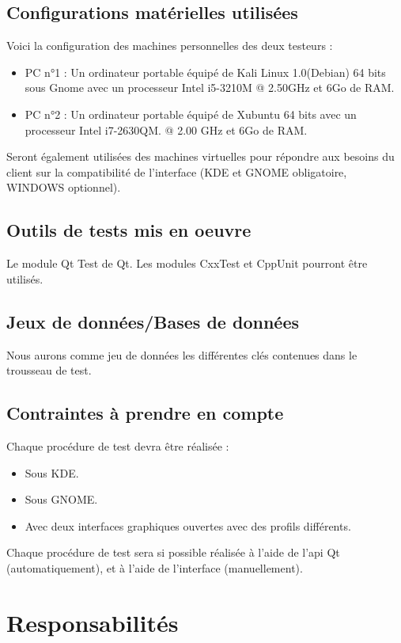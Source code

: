 \documentclass{../res/univ-projet}
\begin{document}
\subsection{Configurations matérielles utilisées}
Voici la configuration des machines personnelles des deux testeurs :
\begin{itemize}
 \item PC n°1 : Un ordinateur portable équipé de Kali Linux 1.0(Debian) 64 bits sous Gnome avec un processeur Intel i5-3210M @ 2.50GHz et 6Go de RAM.
 \item PC n°2 : Un ordinateur portable équipé de Xubuntu 64 bits avec un processeur Intel i7-2630QM.
 @ 2.00 GHz et 6Go de RAM.
\end{itemize}
Seront également utilisées des machines virtuelles pour répondre aux besoins du client sur la compatibilité de l'interface (KDE et GNOME obligatoire,
WINDOWS optionnel).

\subsection{Outils de tests mis en oeuvre}
Le module Qt Test de Qt.
Les modules CxxTest et CppUnit pourront être utilisés.

\subsection{Jeux de données/Bases de données}
Nous aurons comme jeu de données les différentes clés contenues dans le trousseau de test.


\subsection{Contraintes à prendre en compte}
Chaque procédure de test devra être réalisée :
\begin{itemize}
 \item Sous KDE.
 \item Sous GNOME.
 \item Avec deux interfaces graphiques ouvertes avec des profils différents.
\end{itemize}
Chaque procédure de test sera si possible réalisée à l'aide de l'api Qt (automatiquement), et à l'aide de l'interface (manuellement).



\section{Responsabilités}
\end{document}
